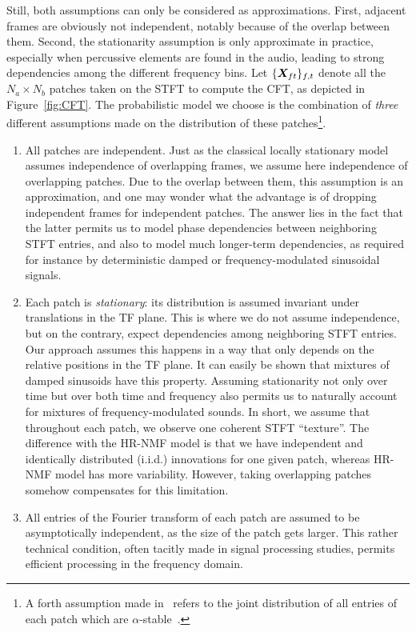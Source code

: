 Still, both assumptions can only be considered as approximations.
First, adjacent frames are obviously not independent, notably because of the overlap between them. 
Second, the stationarity assumption is only approximate in practice, especially when percussive elements are found in the audio, leading to strong dependencies among the different frequency bins. 
Let $\{ {\bm{X}}_{ft}\} _{f,t}$ denote all the $N_{a}\times N_{b}$ patches taken on the \acs{STFT} to compute the CFT, as depicted in Figure~\ref{fig:CFT}. 
The probabilistic model we choose is the combination of \emph{three} different assumptions made on the distribution of these patches\footnote{A forth assumption made in~\cite{stoeter16} refers to the joint distribution of all entries of each patch which are $\alpha$-stable~\cite{samoradnitsky94}.}.

\begin{enumerate}[leftmargin=0cm,itemindent=.5cm,labelwidth=\itemindent,labelsep=0cm,align=left]
\item All patches are independent. 
Just as the classical locally stationary model~\cite{liutkus11t} assumes independence of overlapping frames, we assume here independence of overlapping patches. 
Due to the overlap between them, this assumption is an approximation, and one may wonder what the advantage is of dropping independent frames for independent patches. 
The answer lies in the fact that the latter permits us to model phase dependencies between neighboring \acs{STFT} entries, and also to model much longer-term dependencies, as required for instance by deterministic damped or frequency-modulated sinusoidal signals.\label{enu:assumption_independent_patches}
\item Each patch is \emph{stationary}: its distribution is assumed invariant under translations in the TF plane. 
This is where we do not assume independence, but on the contrary, expect dependencies among neighboring \acs{STFT} entries. 
Our approach assumes this happens in a way that only depends on the relative positions in the TF plane. It can easily be shown that mixtures of damped sinusoids have this property.
Assuming stationarity not only over time but over both time and frequency also permits us to naturally account for mixtures of frequency-modulated sounds. 
In short, we assume that throughout each patch, we observe one coherent \acs{STFT} ``texture''. 
The difference with the HR-NMF model is that we have independent and identically distributed (i.i.d.) innovations for one given patch, whereas HR-NMF model has more variability. 
However, taking overlapping patches somehow compensates for this limitation.\label{enu:assumption_stationary}
\item All entries of the Fourier transform of each patch are assumed to be asymptotically independent, as the size of the patch gets larger.
This rather technical condition, often tacitly made in signal processing studies, permits efficient processing in the frequency domain.\label{enu:assumption_harmonisable}
\end{enumerate}

